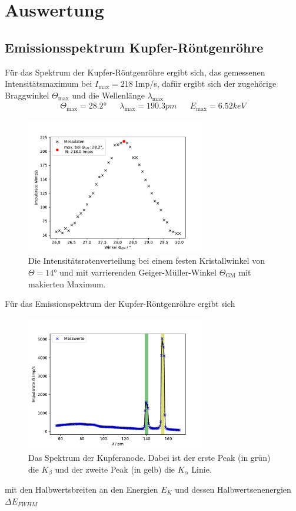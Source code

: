 \newpage
\section{Auswertung}
\subsection{Emissionsspektrum Kupfer-Röntgenröhre}
Für das Spektrum der Kupfer-Röntgenröhre ergibt sich, das gemessenen
Intensitätsmaximum bei $I_{\text{max}}=218\;$Imp/s, dafür ergibt sich
der zugehörige Braggwinkel $\Theta_{\text{max}}$ und die Wellenlänge $\lambda_{\text{max}}$
\begin{align*}
    \Theta_{\text{max}}=28.2° && \lambda_{\text{max}}=190.3\si{pm}&&E_{\text{max}}=6.52\si{keV}
\end{align*}
\begin{figure}[H]
    \centering
    \includegraphics[width=0.7\textwidth]{plots/messdaten1.pdf}
    \caption{Die Intensitätsratenverteilung bei einem festen Kristallwinkel
    von $\Theta=14$° und mit varrierenden Geiger-Müller-Winkel $\Theta_{\text{GM}}$ mit makierten Maximum.}
\end{figure}
Für das Emissionspektrum der Kupfer-Röntgenröhre ergibt sich
\begin{figure}[H]
    \centering
    \includegraphics[width=0.7\textwidth]{plots/spektrum.pdf}
    \caption{Das Spektrum der Kupferanode. Dabei ist der erste Peak (in grün)
    die $K_{\beta}$ und der zweite Peak (in gelb) die $K_{\alpha}$ 
    Linie.}
\end{figure}
mit den Halbwertsbreiten an den Energien $E_K$ und dessen Halbwertsenenergien $\Delta E_{FWHM}$

